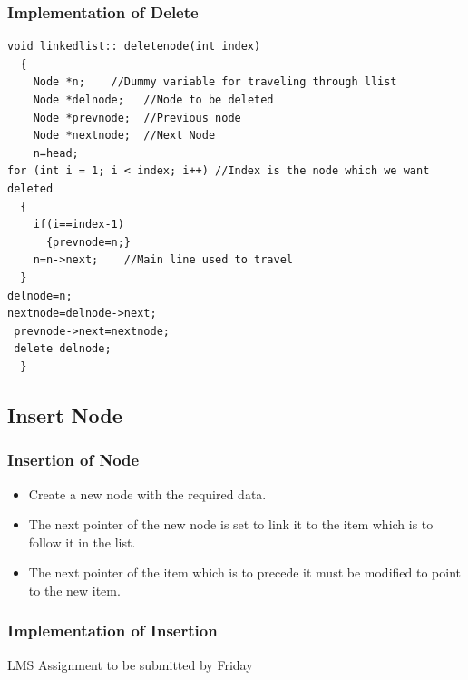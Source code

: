 \documentclass{beamer}
\newtheorem{Key points}{Key points}
\newcommand\Fontviaa{\fontsize{8}{7.2}\selectfont}
\begin{document}
\begin{frame}[fragile]
  \frametitle{Implementation of Delete}
\Fontviaa
\begin{lstlisting}
void linkedlist:: deletenode(int index)
  {
    Node *n;    //Dummy variable for traveling through llist
    Node *delnode;   //Node to be deleted
    Node *prevnode;  //Previous node
    Node *nextnode;  //Next Node
    n=head;
for (int i = 1; i < index; i++) //Index is the node which we want deleted
  {
    if(i==index-1)
      {prevnode=n;}
    n=n->next;    //Main line used to travel
  }
delnode=n;
nextnode=delnode->next;
 prevnode->next=nextnode;
 delete delnode;
  }
\end{lstlisting}
\end{frame}
\subsection{Insert Node}
\begin{frame}
  \frametitle{Insertion of Node}
  \begin{itemize}
  \item Create a new node with the required data.
  \item The next pointer of the new node is set to link 
it to the item which is to follow it in the list.
  \item The next pointer of the item which is to precede 
it must be modified to point to the new item.
  \end{itemize}
\end{frame}
\begin{frame}
  \frametitle{Implementation of Insertion}
  \begin{center}
  \huge{LMS Assignment to be submitted by Friday}    
  \end{center}
\end{frame}
\end{document}
